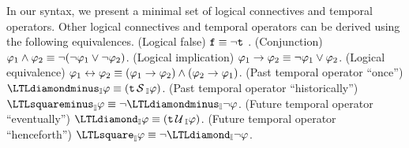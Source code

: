 In our syntax, we present a minimal set of logical connectives and temporal operators. 
Other logical connectives and temporal operators can be derived using the following equivalences. (Logical false) $\mathrm{\texttt{f}}\equiv \neg \mathrm{\texttt{t}}$ . 
(Conjunction) $\varphi_1\wedge\varphi_2\equiv\neg(\neg\varphi_1\vee\neg\varphi_2)$. 
(Logical implication) $\varphi_1\rightarrow\varphi_2\equiv \neg\varphi_1\vee\varphi_2$. 
(Logical equivalence) $\varphi_1\leftrightarrow\varphi_2\equiv (\varphi_1\rightarrow\varphi_2)\wedge(\varphi_2\rightarrow\varphi_1)$. 
(Past temporal operator ``once'') $\once_{\interval}\policy\equiv (\true\since_{\interval}\policy)$. 
(Past temporal operator ``historically'') $\historically_{\interval}\policy\equiv \neg\once_{\interval}\neg\policy$. 
(Future temporal operator ``eventually'') $\eventually_{\interval}\policy\equiv (\true\until_{\interval}\policy)$. 
(Future temporal operator ``henceforth'') $\henceforth_{\interval}\policy\equiv \neg\eventually_{\interval}\neg\policy$. 


